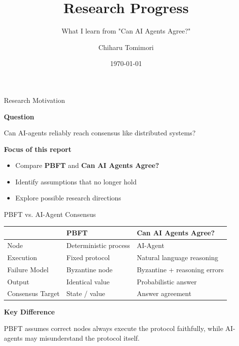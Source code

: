 \documentclass{beamer}
\title{Research Progress}
\subtitle{What I learn from "Can AI Agents Agree?"}
\author{Chiharu Tomimori}
\date{\today}
\begin{document}
\begin{frame}
\titlepage
\end{frame}

\begin{frame}{Research Motivation}

\textbf{Question}

\vspace{0.3cm}

Can AI-agents reliably reach consensus like distributed systems?

\vspace{0.4cm}

\textbf{Focus of this report}

\begin{itemize}
    \item Compare \textbf{PBFT} and \textbf{Can AI Agents Agree?}
    \item Identify assumptions that no longer hold
    \item Explore possible research directions
\end{itemize}

\end{frame}

\begin{frame}{PBFT vs. AI-Agent Consensus}

\small

\begin{tabular}{p{4cm}p{3cm}p{4cm}}
\hline
 & PBFT & Can AI Agents Agree? \\
\hline
Node & Deterministic process & AI-Agent \\
Execution & Fixed protocol & Natural language reasoning \\
Failure Model & Byzantine node & Byzantine + reasoning errors \\
Output & Identical value & Probabilistic answer \\
Consensus Target & State / value & Answer agreement \\
\hline
\end{tabular}

\vspace{0.5cm}

\textbf{Key Difference}

PBFT assumes correct nodes always execute the protocol faithfully,
while AI-agents may misunderstand the protocol itself.

\end{frame}
\end{document}
